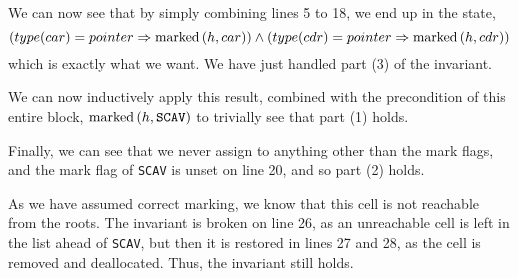 \begin{lemma}
  We can now see that by simply combining lines 5 to 18, we end up in
  the state, \[(type(car) = pointer \Rightarrow \mathrm{marked}\left(h, car\right)) \land
  (type(cdr) = pointer \Rightarrow \mathrm{marked}\left(h, cdr\right))\] which is exactly
  what we want. We have just handled part (3) of the invariant.

  We can now inductively apply this result, combined with the
  precondition of this entire block, $\mathrm{marked}\left(h, \mathtt{SCAV}\right)$ to
  trivially see that part (1) holds.

  Finally, we can see that we never assign to anything other than the
  mark flags, and the mark flag of \texttt{SCAV} is unset on line 20,
  and so part (2) holds.
  \label{lem:lia}
\end{lemma}

\begin{lemma}

  As we have assumed correct marking, we know that this cell is not
  reachable from the roots. The invariant is broken on line 26, as an
  unreachable cell is left in the list ahead of \texttt{SCAV}, but
  then it is restored in lines 27 and 28, as the cell is removed and
  deallocated. Thus, the invariant still holds.
  \label{lem:lib}
\end{lemma}

